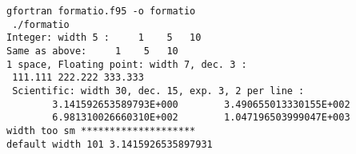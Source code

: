 \begin{Verbatim}[frame=lines,label=formatio - commands and output]
 gfortran formatio.f95 -o formatio
 ./formatio
Integer: width 5 :     1    5   10
Same as above:     1    5   10
1 space, Floating point: width 7, dec. 3 : 
 111.111 222.222 333.333
 Scientific: width 30, dec. 15, exp. 3, 2 per line : 
        3.141592653589793E+000        3.490655013330155E+002
        6.981310026660310E+002        1.047196503999047E+003
width too sm ********************
default width 101 3.1415926535897931
\end{Verbatim}
